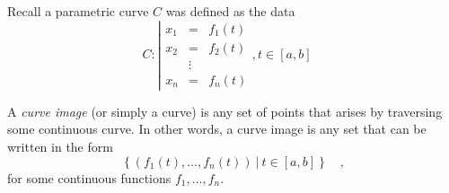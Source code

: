 
\begin{frame}
Recall a parametric curve $C$  was defined as the data
\[
C:
\left| 
\begin{array}{rcl}
x_1&=&f_1(t)\\
x_2&=&f_2(t)\\
&\vdots & \\
x_n&=&f_n(t)
\end{array} \right., t\in [a,b]\quad 
\]
\begin{definition}
A \emph{curve image} (or simply a curve) is any set of points that arises by traversing some \alert<2>{continuous} curve. In other words, a curve image is any set that can be written in the form
\[
\left\{(f_1(t),\dots, f_n(t))~|~ t\in [a,b]\right\}\quad ,
\]
for some \alert<2>{continuous} functions $f_1, \dots, f_n$.
\end{definition}

\end{frame}